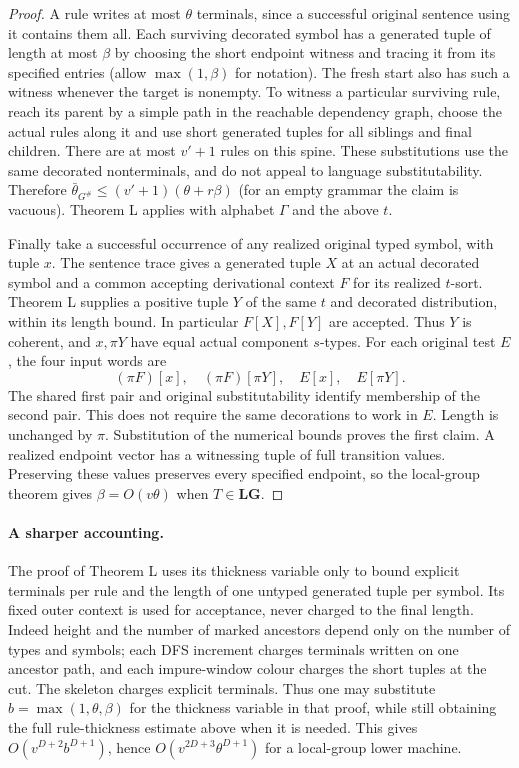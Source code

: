 \documentclass[11pt]{article}
\newcommand{\rdLG}{\mathbf{LG}}
\begin{document}
\begin{proof}
A rule writes at most $\theta$ terminals, since a successful original sentence
using it contains them all. Each surviving decorated symbol has a generated
tuple of length at most $\beta$ by choosing the short endpoint witness and
tracing it from its specified entries (allow $\max(1,\beta)$ for notation).
The fresh start also has such a witness whenever the target is nonempty.
To witness a particular surviving rule, reach its parent by a simple path
in the reachable dependency graph, choose the actual rules along it and use
short generated tuples for all siblings and final children. There are at
most $v'+1$ rules on this spine. These substitutions use the same decorated
nonterminals, and do not appeal to language substitutability. Therefore
$\bar\theta_{G^\#}\le(v'+1)(\theta+r\beta)$ (for an empty grammar the
claim is vacuous). Theorem L applies with alphabet $\Gamma$ and the above $t$.

Finally take a successful occurrence of any realized original typed symbol,
with tuple $x$. The sentence trace gives a generated tuple $X$ at an actual
decorated symbol and a common accepting derivational context $F$ for its
realized $t$-sort. Theorem L supplies a positive tuple $Y$ of the same
$t$ and decorated distribution, within its length bound. In particular
$F[X],F[Y]$ are accepted. Thus $Y$ is coherent, and $x,\pi Y$ have equal
actual component $s$-types. For each original test $E$, the four input
words are
\[ (\pi F)[x],\quad(\pi F)[\pi Y],\quad E[x],\quad E[\pi Y]. \] The shared first
pair and original substitutability identify membership of the second pair.
This does not require the same decorations to work in $E$. Length is
unchanged by $\pi$. Substitution of the numerical bounds proves the first
claim. A realized endpoint vector has a witnessing tuple of full transition
values. Preserving these values preserves every specified endpoint, so
the local-group theorem gives $\beta=O(v\theta)$ when $T\in\rdLG$.
\end{proof}

\paragraph{A sharper accounting.}
The proof of Theorem L uses its thickness variable only to bound explicit
terminals per rule and the length of one untyped generated tuple per symbol.
Its fixed outer context is used for acceptance, never charged to the final
length. Indeed height and the number of marked ancestors depend only on
the number of types and symbols; each DFS increment charges terminals
written on one ancestor path, and each impure-window colour charges the
short tuples at the cut. The skeleton charges explicit terminals.
Thus one may substitute $b=\max(1,\theta,\beta)$ for the thickness variable
in that proof, while still obtaining the full rule-thickness estimate above
when it is needed. This gives $O(v^{D+2}b^{D+1})$, hence
$O(v^{2D+3}\theta^{D+1})$ for a local-group lower machine.
\end{document}

